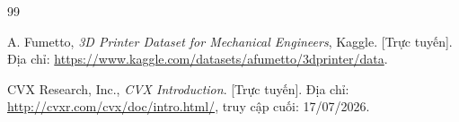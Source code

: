 \documentclass[
]{article}
\begin{document}











\newpage


\begin{thebibliography}{99}

A. Fumetto, \textit{3D Printer Dataset for Mechanical Engineers}, Kaggle. [Trực tuyến]. Địa chỉ: \url{https://www.kaggle.com/datasets/afumetto/3dprinter/data}.

CVX Research, Inc., \textit{CVX Introduction}. [Trực tuyến]. Địa chỉ: \url{http://cvxr.com/cvx/doc/intro.html/}, truy cập cuối: 17/07/2026.

\end{thebibliography}
\end{document}
